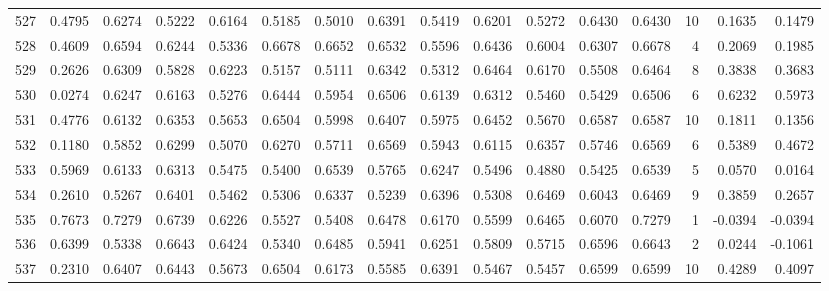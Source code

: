 \begin{tabular}{lrrrrrrrrrrrrrrr}
527 &      0.4795 &  0.6274 &  0.5222 &  0.6164 &  0.5185 &  0.5010 &  0.6391 &  0.5419 &  0.6201 &  0.5272 &   0.6430 &     0.6430 &     10 &                    0.1635 &                     0.1479 \\
528 &      0.4609 &  0.6594 &  0.6244 &  0.5336 &  0.6678 &  0.6652 &  0.6532 &  0.5596 &  0.6436 &  0.6004 &   0.6307 &     0.6678 &      4 &                    0.2069 &                     0.1985 \\
529 &      0.2626 &  0.6309 &  0.5828 &  0.6223 &  0.5157 &  0.5111 &  0.6342 &  0.5312 &  0.6464 &  0.6170 &   0.5508 &     0.6464 &      8 &                    0.3838 &                     0.3683 \\
530 &      0.0274 &  0.6247 &  0.6163 &  0.5276 &  0.6444 &  0.5954 &  0.6506 &  0.6139 &  0.6312 &  0.5460 &   0.5429 &     0.6506 &      6 &                    0.6232 &                     0.5973 \\
531 &      0.4776 &  0.6132 &  0.6353 &  0.5653 &  0.6504 &  0.5998 &  0.6407 &  0.5975 &  0.6452 &  0.5670 &   0.6587 &     0.6587 &     10 &                    0.1811 &                     0.1356 \\
532 &      0.1180 &  0.5852 &  0.6299 &  0.5070 &  0.6270 &  0.5711 &  0.6569 &  0.5943 &  0.6115 &  0.6357 &   0.5746 &     0.6569 &      6 &                    0.5389 &                     0.4672 \\
533 &      0.5969 &  0.6133 &  0.6313 &  0.5475 &  0.5400 &  0.6539 &  0.5765 &  0.6247 &  0.5496 &  0.4880 &   0.5425 &     0.6539 &      5 &                    0.0570 &                     0.0164 \\
534 &      0.2610 &  0.5267 &  0.6401 &  0.5462 &  0.5306 &  0.6337 &  0.5239 &  0.6396 &  0.5308 &  0.6469 &   0.6043 &     0.6469 &      9 &                    0.3859 &                     0.2657 \\
535 &      0.7673 &  0.7279 &  0.6739 &  0.6226 &  0.5527 &  0.5408 &  0.6478 &  0.6170 &  0.5599 &  0.6465 &   0.6070 &     0.7279 &      1 &                   -0.0394 &                    -0.0394 \\
536 &      0.6399 &  0.5338 &  0.6643 &  0.6424 &  0.5340 &  0.6485 &  0.5941 &  0.6251 &  0.5809 &  0.5715 &   0.6596 &     0.6643 &      2 &                    0.0244 &                    -0.1061 \\
537 &      0.2310 &  0.6407 &  0.6443 &  0.5673 &  0.6504 &  0.6173 &  0.5585 &  0.6391 &  0.5467 &  0.5457 &   0.6599 &     0.6599 &     10 &                    0.4289 &                     0.4097 \\

\end{tabular}
